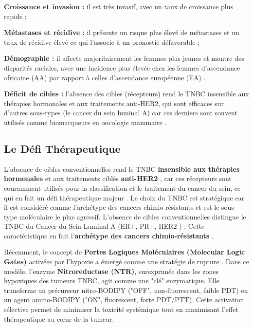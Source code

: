 \textbf{Croissance et invasion :} il est très invasif, avec un taux de croissance plus rapide  \cite{James2024, Oehler2024};

\textbf{Métastases et récidive :} il présente un risque plus élevé de métastases et un taux de récidive élevé ce qui l'associe à un pronostic défavorable  \cite{James2024, Oehler2024};

\textbf{Démographie :} il affecte majoritairement les femmes plus jeunes \cite{Syeda2025, Oehler2024} et montre des disparités raciales, avec une incidence plus élevée chez les femmes d'ascendance africaine (AA) par rapport à celles d'ascendance européenne (EA) \cite{Kumar2025a, Oehler2024}.

\textbf{Déficit de cibles :} l'absence des cibles (récepteurs) rend le TNBC insensible aux thérapies hormonales et aux traitements anti-HER2, qui sont efficaces sur d'autres sous-types (le cancer du sein luminal A) car ces derniers sont souvent utilisés comme biomarqueurs en oncologie mammaire \cite{Ma2025, Kong_2023, Paulson2025}.

\subsection{Le Défi Thérapeutique}
L'absence de cibles conventionnelles rend le TNBC \textbf{insensible aux thérapies hormonales} et aux traitements ciblés \textbf{anti-HER2} \cite{Ma2025,Kong_2023,Paulson2025}, car ces récepteurs sont couramment utilisés pour la classification et le traitement du cancer du sein, ce qui en fait un défi thérapeutique majeur \cite{Daester2016}.
Le choix du TNBC est stratégique car il est considéré comme l'archétype des cancers chimio-résistants et est le sous-type moléculaire le plus agressif. L'absence de cibles conventionnelles distingue le TNBC du Cancer du Sein Luminal A (ER+, PR+, HER2-) \cite{Wang2025a, Liu2025}. Cette caractéristique en fait l'\textbf{archétype des cancers chimio-résistants}  \cite{Ma2025, Gao2024}.

Récemment, le concept de \textbf{Portes Logiques Moléculaires (Molecular Logic Gates)} activées par l'hypoxie a émergé comme une stratégie de rupture \cite{Wang2026, Liu2025}. Dans ce modèle, l'enzyme \textbf{Nitroreductase (NTR)}, surexprimée dans les zones hypoxiques des tumeurs TNBC, agit comme une "clé" enzymatique. Elle transforme un précurseur nitro-BODIPY ("OFF", non-fluorescent, faible PDT) en un agent amino-BODIPY ("ON", fluorescent, forte PDT/PTT). Cette activation sélective permet de minimiser la toxicité systémique tout en maximisant l'effet thérapeutique au cœur de la tumeur.

